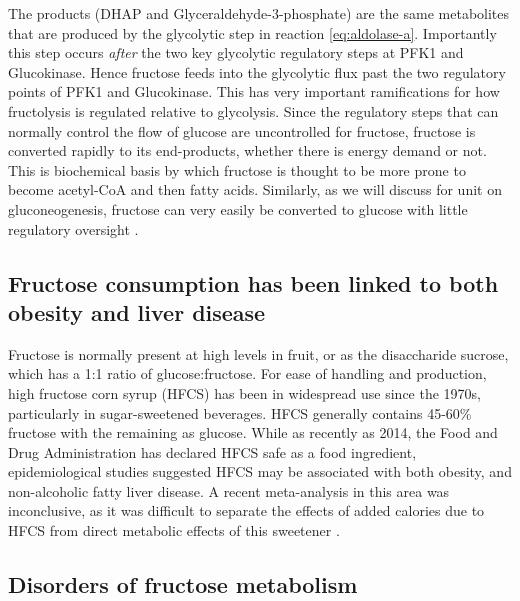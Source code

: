 \documentclass{tufte-handout}
\begin{document}
The products (DHAP and Glyceraldehyde-3-phosphate) are the same metabolites that are produced by the glycolytic step in reaction \ref{eq:aldolase-a}.  Importantly this step occurs \emph{after} the two key glycolytic regulatory steps at PFK1 and Glucokinase. Hence fructose feeds into the glycolytic flux past the two regulatory points of PFK1 and Glucokinase. This has very important ramifications for how fructolysis is regulated  relative to glycolysis.  Since the regulatory steps that can normally control the flow of glucose are uncontrolled for fructose, fructose is converted rapidly to its end-products, whether there is energy demand or not.  This is biochemical basis by which fructose is thought to be more prone to become acetyl-CoA and then fatty acids.  Similarly, as we will discuss for unit on gluconeogenesis, fructose can very easily be converted to glucose with little regulatory oversight \citep{Kim2016d}.

\subsection{Fructose consumption has been linked to both obesity and liver disease}

Fructose is normally present at high levels in fruit, or as the disaccharide sucrose, which has a 1:1 ratio of glucose:fructose.  For ease of handling and production, high fructose corn syrup (HFCS) has been in widespread use since the 1970s, particularly in sugar-sweetened beverages.  HFCS generally contains 45-60\% fructose with the remaining as glucose.   While as recently as 2014, the Food and Drug Administration has declared HFCS safe as a food ingredient, epidemiological studies suggested HFCS may be associated with both obesity, and non-alcoholic fatty liver disease.  A recent meta-analysis in this area was inconclusive, as it was difficult to separate the effects of added calories due to HFCS from direct metabolic effects of this sweetener \citep{Chung2014}.

\subsection{Disorders of fructose metabolism}
\end{document}
